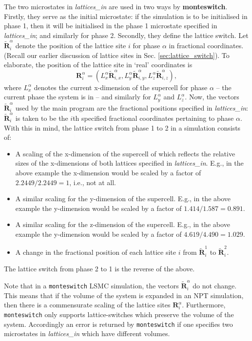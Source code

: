 \documentclass{report}
\begin{document}
The two microstates in \emph{lattices\_in} are used in two ways by \textbf{monteswitch}. Firstly, they serve as the initial microstate: if the 
simulation is to be initialised in phase 1, then it will be initialised in the phase 1 microstate specified in \emph{lattices\_in}; and 
similarly for phase 2. Secondly, they define the lattice switch. Let $\tilde{\mathbf{R}}^{\alpha}_i$ denote the position of the lattice site $i$
for phase $\alpha$ in fractional coordinates. (Recall our earlier discussion of lattice sites in Sec. \ref{sec:lattice_switch}). To elaborate,
the position of the lattice site in `real' coordinates is 
\begin{equation}
\mathbf{R}^{\alpha}_i=(L_x^{\alpha}\tilde{\mathbf{R}}^{\alpha}_{i,x},L_y^{\alpha}\tilde{\mathbf{R}}^{\alpha}_{i,y},L_z^{\alpha}\tilde{\mathbf{R}}^{\alpha}_{i,z}),
\end{equation}
where $L_x^{\alpha}$ denotes the current x-dimension of the supercell for phase $\alpha$ -- the current phase the system is in -- and similarly for
$L_y^{\alpha}$ and $L_z^{\alpha}$. Now, the vectors $\tilde{\mathbf{R}}^{\alpha}_i$ used by the main program are the fractional positions specified in 
\emph{lattices\_in}: $\tilde{\mathbf{R}}^{\alpha}_i$ is taken to be the $i$th specified fractional coordinates pertaining to phase $\alpha$.
With this in mind, the lattice switch from phase 1 to 2 in a simulation consists of:
\begin{itemize}
\item A scaling of the x-dimension of the supercell of which reflects the relative sizes of the x-dimensions of both lattices specified in 
\emph{lattices\_in}. E.g., in the above example the x-dimension would be scaled by a factor of $2.2449/2.2449=1$, i.e., not at all.
\item A similar scaling for the y-dimension of the supercell. E.g., in the above example the y-dimension would be scaled by a factor of
$1.414/1.587=0.891$.
\item A similar scaling for the z-dimension of the supercell. E.g., in the above example the y-dimension would be scaled by a factor of
$4.619/4.490=1.029$.
\item A change in the fractional position of each lattice site $i$ from $\tilde{\mathbf{R}}^{1}_i$ to $\tilde{\mathbf{R}}^{2}_i$.
\end{itemize}
The lattice switch from phase 2 to 1 is the reverse of the above.

Note that in a \texttt{monteswitch} LSMC simulation, the vectors $\tilde{\mathbf{R}}^{\alpha}_i$ do not change. This means that
if the volume of the system is expanded in an NPT simulation, then there is a commensurate scaling of the lattice sites 
$\mathbf{R}^{\alpha}_i$. Furthermore, \texttt{monteswitch} only supports lattice-switches which preserve the volume of the system.
Accordingly an error is returned by \texttt{monteswitch} if one specifies two microstates in \emph{lattices\_in} which have different
volumes.
\end{document}
